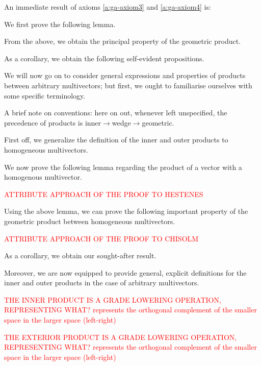 An immediate result of axioms \ref{a:ga-axiom3} and \ref{a:ga-axiom4} is:


We first prove the following lemma.



From the above, we obtain the principal property of the geometric product.



As a corollary, we obtain the following self-evident propositions.



We will now go on to consider general expressions and properties of products between arbitrary multivectors; but first, we ought to familiarise ourselves with some specific terminology.

A brief note on conventions: here on out, whenever left unspecified, the precedence of products is inner$\to$wedge$\to$geometric.

First off, we generalize the definition of the inner and outer products to homogeneous multivectors.



We now prove the following lemma regarding the product of a vector with a homogenous multivector.



\textcolor{red}{ATTRIBUTE APPROACH OF THE PROOF TO HESTENES}

Using the above lemma, we can prove the following important property of the geometric product between homogeneous multivectors.



\textcolor{red}{ATTRIBUTE APPROACH OF THE PROOF TO CHISOLM}

As a corollary, we obtain our sought-after result.



Moreover, we are now equipped to provide general, explicit definitions for the inner and outer products in the case of arbitrary multivectors.

\textcolor{red}{THE INNER PRODUCT IS A GRADE LOWERING OPERATION, REPRESENTING WHAT? represents the orthogonal complement of the smaller space in the larger space (left-right)}

\textcolor{red}{THE EXTERIOR PRODUCT IS A GRADE LOWERING OPERATION, REPRESENTING WHAT? represents the orthogonal complement of the smaller space in the larger space (left-right)}

